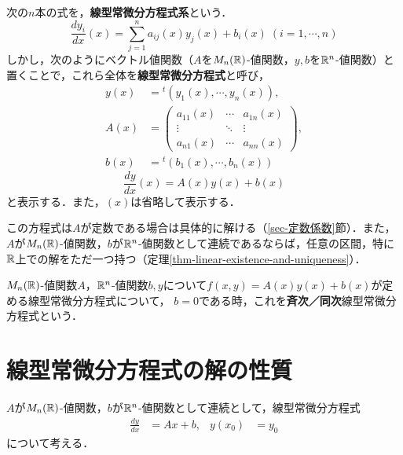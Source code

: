 \documentclass[uplatex,dvipdfmx]{jsreport}
\begin{document}
\begin{definition}[線型常微分方程式]
    次の$n$本の式を，\textbf{線型常微分方程式系}という．
    \[ \frac{dy_i}{dx}(x) = \sum^n_{j=1}a_{ij}(x)y_j(x)+b_i(x)\;(i=1,\cdots,n) \]
    しかし，次のようにベクトル値関数（$A$を$M_n(\mathbb{R})$-値関数，$y,b$を$\mathbb{R}^n$-値関数）と置くことで，これら全体を\textbf{線型常微分方程式}と呼び，
    \begin{align*}
        y(x) &={}^t(y_1(x),\cdots,y_n(x)),\\
        A(x) &= \begin{pmatrix}a_{11}(x)&\cdots&a_{1n}(x)\\\vdots&\ddots&\vdots\\a_{n1}(x)&\cdots&a_{nn}(x)\end{pmatrix},\\
        b(x) &= {}^t(b_1(x),\cdots,b_n(x))
    \end{align*}
    \[\frac{dy}{dx}(x)=A(x)y(x)+b(x)\]
    と表示する．また，$(x)$は省略して表示する．
\end{definition}
この方程式は$A$が定数である場合は具体的に解ける（\ref{sec-定数係数}節）．また，$A$が$M_n(\mathbb{R})$-値関数，$b$が$\mathbb{R}^n$-値関数として連続であるならば，任意の区間，特に$\mathbb{R}$上での解をただ一つ持つ（定理\ref{thm-linear-existence-and-uniqueness}）．
\begin{definition}
    $M_n(\mathbb{R})$-値関数$A$，$\mathbb{R}^n$-値関数$b,y$について$f(x,y)=A(x)y(x)+b(x)$が定める線型常微分方程式について，
    $b=0$である時，これを\textbf{斉次／同次}線型常微分方程式という．
\end{definition}

\section{線型常微分方程式の解の性質}
$A$が$M_n(\mathbb{R})$-値関数，$b$が$\mathbb{R}^n$-値関数として連続として，線型常微分方程式
\begin{align}\label{equation-linear-ODE}
        \frac{dy}{dx}&=Ax+b,&
        y(x_0)&=y_0
\end{align}
について考える．
\end{document}
